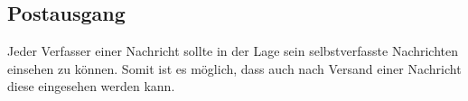 \subsection{Postausgang}

Jeder Verfasser einer Nachricht sollte in der Lage sein selbstverfasste Nachrichten einsehen zu können. Somit ist es möglich, dass auch nach Versand einer Nachricht diese eingesehen werden kann. 